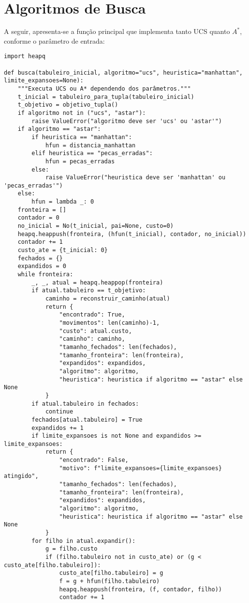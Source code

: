 \section{Algoritmos de Busca}  
  
A seguir, apresenta-se a função principal que implementa tanto UCS quanto $A^*$, conforme o parâmetro de entrada:  
  
\begin{verbatim}  
import heapq  
  
def busca(tabuleiro_inicial, algoritmo="ucs", heuristica="manhattan", limite_expansoes=None):  
    """Executa UCS ou A* dependendo dos parâmetros."""  
    t_inicial = tabuleiro_para_tupla(tabuleiro_inicial)  
    t_objetivo = objetivo_tupla()  
    if algoritmo not in ("ucs", "astar"):  
        raise ValueError("algoritmo deve ser 'ucs' ou 'astar'")  
    if algoritmo == "astar":  
        if heuristica == "manhattan":  
            hfun = distancia_manhattan  
        elif heuristica == "pecas_erradas":  
            hfun = pecas_erradas  
        else:  
            raise ValueError("heuristica deve ser 'manhattan' ou 'pecas_erradas'")  
    else:  
        hfun = lambda _: 0  
    fronteira = []  
    contador = 0  
    no_inicial = No(t_inicial, pai=None, custo=0)  
    heapq.heappush(fronteira, (hfun(t_inicial), contador, no_inicial))  
    contador += 1  
    custo_ate = {t_inicial: 0}  
    fechados = {}  
    expandidos = 0  
    while fronteira:  
        _, _, atual = heapq.heappop(fronteira)  
        if atual.tabuleiro == t_objetivo:  
            caminho = reconstruir_caminho(atual)  
            return {  
                "encontrado": True,  
                "movimentos": len(caminho)-1,  
                "custo": atual.custo,  
                "caminho": caminho,  
                "tamanho_fechados": len(fechados),  
                "tamanho_fronteira": len(fronteira),  
                "expandidos": expandidos,  
                "algoritmo": algoritmo,  
                "heuristica": heuristica if algoritmo == "astar" else None  
            }  
        if atual.tabuleiro in fechados:  
            continue  
        fechados[atual.tabuleiro] = True  
        expandidos += 1  
        if limite_expansoes is not None and expandidos >= limite_expansoes:  
            return {  
                "encontrado": False,  
                "motivo": f"limite_expansoes={limite_expansoes} atingido",  
                "tamanho_fechados": len(fechados),  
                "tamanho_fronteira": len(fronteira),  
                "expandidos": expandidos,  
                "algoritmo": algoritmo,  
                "heuristica": heuristica if algoritmo == "astar" else None  
            }  
        for filho in atual.expandir():  
            g = filho.custo  
            if (filho.tabuleiro not in custo_ate) or (g < custo_ate[filho.tabuleiro]):  
                custo_ate[filho.tabuleiro] = g  
                f = g + hfun(filho.tabuleiro)  
                heapq.heappush(fronteira, (f, contador, filho))  
                contador += 1  
\end{verbatim}  
  
